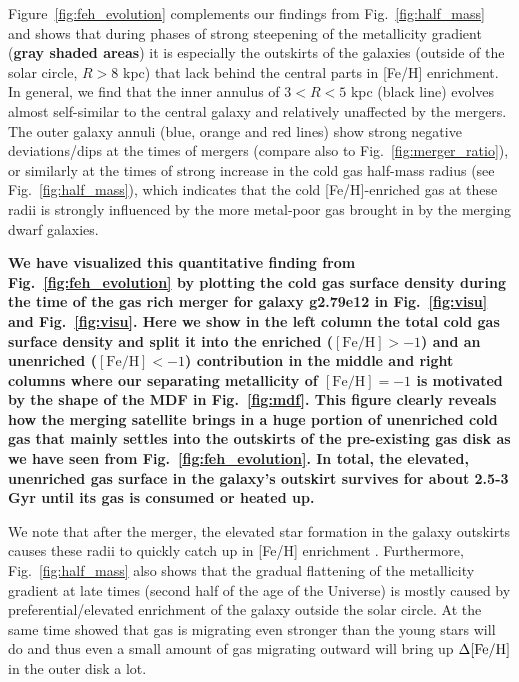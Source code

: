 \documentclass[useAMS,usenatbib]{mnras}
\begin{document}
Figure~\ref{fig:feh_evolution} complements our findings from Fig.~\ref{fig:half_mass} and shows that during phases of strong steepening of the metallicity gradient (\textbf{gray shaded areas}) it is especially the outskirts of the galaxies (outside of the solar circle, $R>8$ kpc) that lack behind the central parts in [Fe/H] enrichment. In general, we find that the inner annulus of $3<R<5$ kpc (black line) evolves almost self-similar to the central galaxy and relatively unaffected by the mergers. The outer galaxy annuli (blue, orange and red lines) show strong negative deviations/dips at the times of mergers (compare also to Fig.~\ref{fig:merger_ratio}), or similarly at the times of strong increase in the cold gas half-mass radius (see Fig.~\ref{fig:half_mass}), which indicates that the cold [Fe/H]-enriched gas at these radii is strongly influenced by the more metal-poor gas brought in by the merging dwarf galaxies. 

\textbf{We have visualized this quantitative finding from Fig.~\ref{fig:feh_evolution} by plotting the cold gas surface density during the time of the gas rich merger for galaxy g2.79e12 in Fig.~\ref{fig:visu} and Fig.~\ref{fig:visu}. Here we show in the left column the total cold gas surface density and split it into the enriched ($\mathrm{[Fe/H]}>-1$) and an unenriched ($\mathrm{[Fe/H]}<-1$) contribution in the middle and right columns where our separating metallicity of $\mathrm{[Fe/H]}=-1$ is motivated by the shape of the MDF in Fig.~\ref{fig:mdf}. This figure clearly reveals how the merging satellite brings in a huge portion of unenriched cold gas that mainly settles into the outskirts of the pre-existing gas disk as we have seen from Fig.~\ref{fig:feh_evolution}. In total, the elevated, unenriched gas surface in the galaxy's outskirt survives for about 2.5-3 Gyr until its gas is consumed or heated up.}

We note that after the merger, the elevated star formation in the galaxy outskirts causes these radii to quickly catch up in [Fe/H] enrichment \citep[see also Fig. 7 in][]{Buck2020}. Furthermore, Fig.~\ref{fig:half_mass} also shows that the gradual flattening of the metallicity gradient at late times (second half of the age of the Universe) is mostly caused by preferential/elevated enrichment of the galaxy outside the solar circle. At the same time \cite{Minchev2012a} showed that gas is migrating even stronger than the young stars will do and thus even a small amount of gas migrating outward will bring up $\Delta\rm{[Fe/H]}$ in the outer disk a lot.
\end{document}
